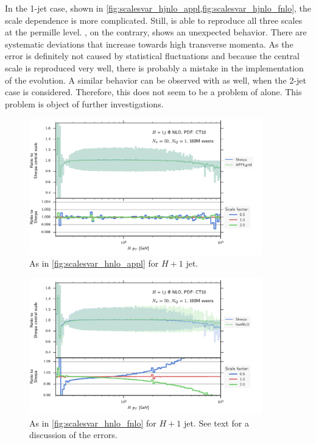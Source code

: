 In the 1-jet case, shown in \cref{fig:scalesvar_hjnlo_appl,fig:scalesvar_hjnlo_fnlo}, the scale dependence is more complicated.
Still, \appl{} is able to reproduce all three scales at the permille level.
\fnlo{}, on the contrary, shows an unexpected behavior.
There are systematic deviations that increase towards high transverse momenta.
As the error is definitely not caused by statistical fluctuations and because the central scale is reproduced very well, there is probably a mistake in the implementation of the evolution.
A similar behavior can be observed with \appl{} as well, when the 2-jet case is considered.
Therefore, this does not seem to be a problem of \fnlo{} alone.
This problem is object of further investigations.
%
\begin{figure}
	\centering
	\includegraphics[width=0.9\textwidth]{images/scalesvar_hjnlo_appl.pdf}
	\caption{As in \cref{fig:scalesvar_hnlo_appl} for $H + 1$ jet.}
	\label{fig:scalesvar_hjnlo_appl}
\end{figure}
%
\begin{figure}
	\centering
	\includegraphics[width=0.9\textwidth]{images/scalesvar_hjnlo_fnlo.pdf}
	\caption{As in \cref{fig:scalesvar_hnlo_fnlo} for $H + 1$ jet.
			See text for a discussion of the errors.}
	\label{fig:scalesvar_hjnlo_fnlo}
\end{figure}
%
